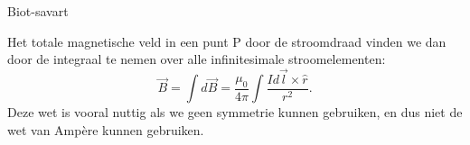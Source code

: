 \begin{lem}{Biot-savart}
\begin{center}
    \end{center}
    Het totale magnetische veld in een punt P door de stroomdraad vinden we dan door de integraal te nemen over alle infinitesimale stroomelementen:
    \begin{equation*}
        \Vec{B} = \int d\Vec{B} = \dfrac{\mu_{0}}{4\pi} \int \dfrac{Id\Vec{l} \times \hat{r}}{r^{2}}.
    \end{equation*}
    Deze wet is vooral nuttig als we geen symmetrie kunnen gebruiken, en dus niet de wet van Ampère kunnen gebruiken. 
\end{lem}


\newpage

    

